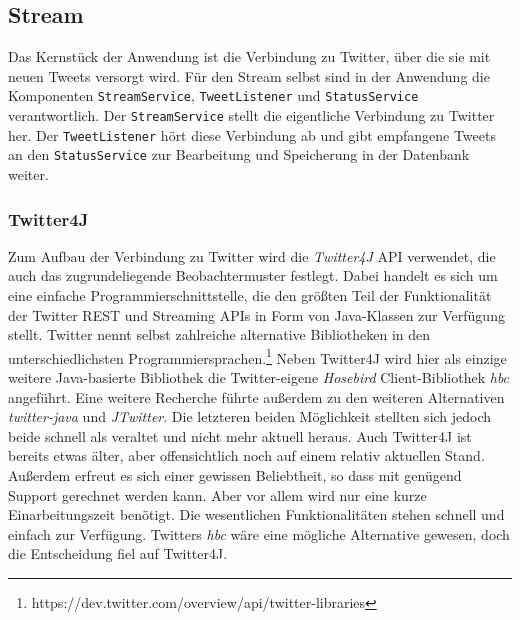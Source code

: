 \subsection{Stream}
Das Kernstück der Anwendung ist die Verbindung zu Twitter, über die sie mit neuen Tweets versorgt wird. 
Für den Stream selbst sind in der Anwendung die Komponenten \texttt{StreamService}, \texttt{TweetListener} und 
\texttt{StatusService} verantwortlich. Der \texttt{StreamService} stellt die eigentliche Verbindung zu Twitter her. Der 
\texttt{TweetListener} hört diese Verbindung ab und gibt empfangene Tweets an den \texttt{StatusService} zur Bearbeitung 
und Speicherung in der Datenbank weiter.

\subsubsection*{Twitter4J}
Zum Aufbau der Verbindung zu Twitter wird die \textit{Twitter4J} API verwendet, die auch das zugrundeliegende 
Beobachtermuster festlegt. Dabei handelt es sich um eine einfache Programmierschnittstelle, die den 
größten Teil der Funktionalität der Twitter REST und Streaming APIs in Form von Java-Klassen zur 
Verfügung stellt. Twitter nennt selbst zahlreiche alternative Bibliotheken in den unterschiedlichsten 
Programmiersprachen.\footnote{https://dev.twitter.com/overview/api/twitter-libraries} Neben Twitter4J wird hier als einzige weitere Java-basierte Bibliothek die Twitter-eigene 
\textit{Hosebird} Client-Bibliothek \textit{hbc} angeführt. Eine weitere Recherche führte außerdem zu den weiteren Alternativen 
\textit{twitter-java} und \textit{JTwitter}. Die letzteren beiden Möglichkeit stellten sich jedoch beide schnell als veraltet und 
nicht mehr aktuell heraus. Auch Twitter4J ist bereits etwas älter, aber offensichtlich noch auf einem relativ 
aktuellen Stand. Außerdem erfreut es sich einer gewissen Beliebtheit, so dass mit genügend Support gerechnet 
werden kann. Aber vor allem wird nur eine kurze Einarbeitungszeit benötigt. Die wesentlichen Funktionalitäten 
stehen schnell und einfach zur Verfügung. Twitters \textit{hbc} wäre eine mögliche Alternative gewesen, doch 
die Entscheidung fiel auf Twitter4J.

